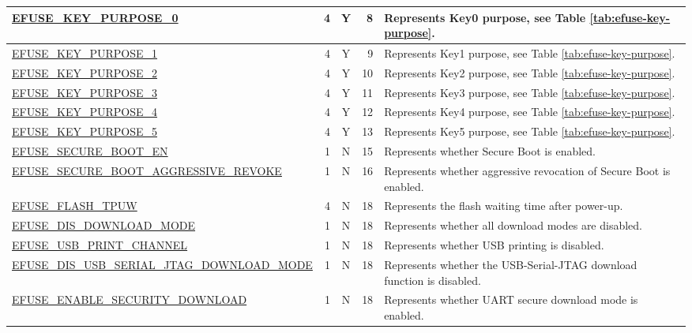 \begin{longtable}[c]{ |m{8.2cm}|r|c|r|m{9cm}| }
    \hline
    \hyperref[fielddesc:EFUSEKEYPURPOSE0]{EFUSE\_KEY\_PURPOSE\_0}  & 4 & Y & 8 & Represents Key0 purpose, see Table \ref{tab:efuse-key-purpose}. \\
    \hline
    \hyperref[fielddesc:EFUSEKEYPURPOSE1]{EFUSE\_KEY\_PURPOSE\_1}  & 4 & Y & 9 & Represents Key1 purpose, see Table \ref{tab:efuse-key-purpose}. \\
    \hline
    \hyperref[fielddesc:EFUSEKEYPURPOSE2]{EFUSE\_KEY\_PURPOSE\_2}  & 4 & Y & 10 & Represents Key2 purpose, see Table  \ref{tab:efuse-key-purpose}. \\ 
    \hline
    \hyperref[fielddesc:EFUSEKEYPURPOSE3]{EFUSE\_KEY\_PURPOSE\_3}  & 4 & Y & 11 & Represents Key3 purpose, see Table \ref{tab:efuse-key-purpose}. \\    
    \hline
    \hyperref[fielddesc:EFUSEKEYPURPOSE4]{EFUSE\_KEY\_PURPOSE\_4} & 4 & Y & 12 & Represents Key4 purpose, see Table \ref{tab:efuse-key-purpose}. \\    
    \hline
    \hyperref[fielddesc:EFUSEKEYPURPOSE5]{EFUSE\_KEY\_PURPOSE\_5}  & 4 & Y & 13 & Represents Key5 purpose, see Table \ref{tab:efuse-key-purpose}. \\  
    \hline
    \hyperref[fielddesc:EFUSESECUREBOOTEN]{EFUSE\_SECURE\_BOOT\_EN} & 1 & N & 15 & Represents whether Secure Boot is enabled. \\ 
    \hline
    \hyperref[fielddesc:EFUSESECUREBOOTAGGRESSIVEREVOKE]{EFUSE\_SECURE\_BOOT\_AGGRESSIVE\_REVOKE}  & 1 & N & 16 & Represents whether aggressive revocation of Secure Boot is enabled. \\
    \hline
    \hyperref[fielddesc:EFUSEFLASHTPUW]{EFUSE\_FLASH\_TPUW} & 4 & N & 18 & Represents the flash waiting time after power-up. \\    
    \hline    
    \hyperref[fielddesc:EFUSEDISDOWNLOADMODE]{EFUSE\_DIS\_DOWNLOAD\_MODE}  & 1 & N & 18 & Represents whether all download modes are disabled.\\       
    \hline
    \hyperref[fielddesc:EFUSEUSBPRINTCHANNEL]{EFUSE\_USB\_PRINT\_CHANNEL}  & 1 & N & 18 & Represents whether USB printing is disabled.
    \\
    \hline 
    \hyperref[fielddesc:EFUSEDISUSBDOWNLOADMODE]{EFUSE\_DIS\_USB\_SERIAL\_JTAG\_DOWNLOAD\_MODE}  & 1 & N & 18 & Represents whether the USB-Serial-JTAG download function is disabled. \\
    \hline 
    \hyperref[fielddesc:EFUSEENABLESECURITYDOWNLOAD]{EFUSE\_ENABLE\_SECURITY\_DOWNLOAD} & 1 & N & 18 & Represents whether UART secure download mode is enabled. \\

\end{longtable}

